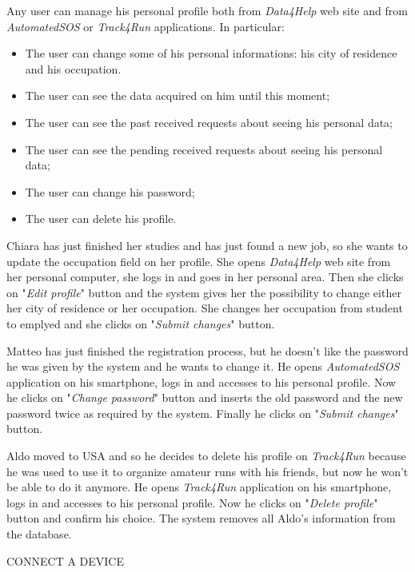 Any user can manage his personal profile both from \textit{Data4Help} web site and from \textit{AutomatedSOS} or \textit{Track4Run} applications. In particular:
\begin{itemize}
  \item The user can change some of his personal informations: his city of residence and his occupation.
  \item The user can see the data acquired on him until this moment;
  \item The user can see the past received requests about seeing his personal data;
  \item The user can see the pending received requests about seeing his personal data;
  \item The user can change his password;
  \item The user can delete his profile.
\end{itemize}

Chiara has just finished her studies and has just found a new job, so she wants to update the occupation field on her profile. She opens \textit{Data4Help} web site from her personal computer, she logs in and goes in her personal area. Then she clicks on "\textit{Edit profile}" button and the system gives her the possibility to change either her city of residence or her occupation. She changes her occupation from student to emplyed and she clicks on "\textit{Submit changes}" button.

Matteo has just finished the registration process, but he doesn't like the password he was given by the system and he wants to change it. He opens \textit{AutomatedSOS} application on his smartphone, logs in and accesses to his personal profile. Now he clicks on "\textit{Change password}" button and inserts the old password and the new password twice as required by the system. Finally he clicks on "\textit{Submit changes}" button.

Aldo moved to USA and so he decides to delete his profile on \textit{Track4Run} because he was used to use it to organize amateur runs with his friends, but now he won't be able to do it anymore. He opens \textit{Track4Run} application on his smartphone, logs in and accesses to his personal profile. Now he clicks on "\textit{Delete profile}" button and confirm his choice. The system removes all Aldo's information from the database.

CONNECT A DEVICE

